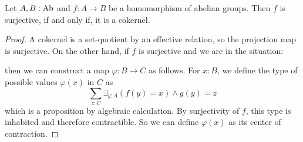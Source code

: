 \begin{lemma}%
  \label{surjective-abgroup-hom-is-cokernel}
  Let $A,B:\operatorname{Ab}$ and $f:A\to B$ be a homomorphism of abelian groups.
  Then $f$ is surjective, if and only if, it is a cokernel.
\end{lemma}

\begin{proof}
  A cokernel is a set-quotient by an effective relation,
  so the projection map is surjective.
  On the other hand, if $f$ is surjective and we are in the situation:
  \begin{center}
  \end{center}
  then we can construct a map $\varphi:B\to C$ as follows.
  For $x:B$, we define the type of possible values $\varphi(x)$ in $C$ as
  \[
    \sum_{z:C}\exists_{y:A}(f(y)=x) \wedge g(y)=z
  \]
  which is a proposition by algebraic calculation.
  By surjectivity of $f$, this type is inhabited and therefore contractible.
  So we can define $\varphi(x)$ as its center of contraction.
\end{proof}

